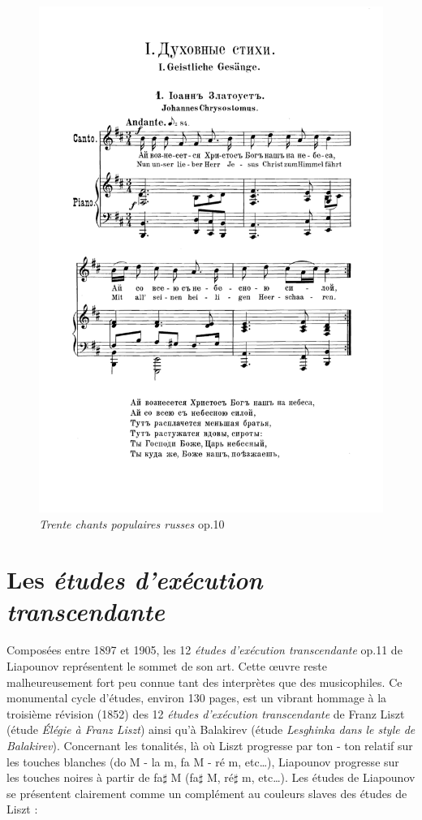 \begin{figure}[!p]
  \includegraphics[width=16cm, keepaspectratio]{chanson.png}
  \caption{\label{chanson}\emph{Trente chants populaires russes} op.10 }
\end{figure}
\newpage

\section{Les \emph{études d'exécution transcendante}}

Composées entre 1897 et 1905, les 12 \emph{études d'exécution transcendante} op.11 de Liapounov représentent le sommet de son art. Cette œuvre reste malheureusement fort peu connue tant des interprètes que des musicophiles. Ce monumental cycle d'études, environ 130 pages, est un vibrant hommage à la troisième révision (1852) des 12 \emph{études d'exécution transcendante} de Franz Liszt (étude  \emph{Élégie à Franz Liszt}) ainsi qu'à Balakirev (étude  \emph{Lesghinka dans le style de Balakirev}). Concernant les tonalités, là où Liszt progresse par ton - ton relatif sur les touches blanches (do M - la m, fa M - ré m, etc\dots), Liapounov progresse sur les touches noires à partir de fa$\sharp$ M (fa$\sharp$ M, ré$\sharp$ m, etc\dots). Les études de Liapounov se présentent clairement comme un complément au couleurs slaves des études de Liszt :

